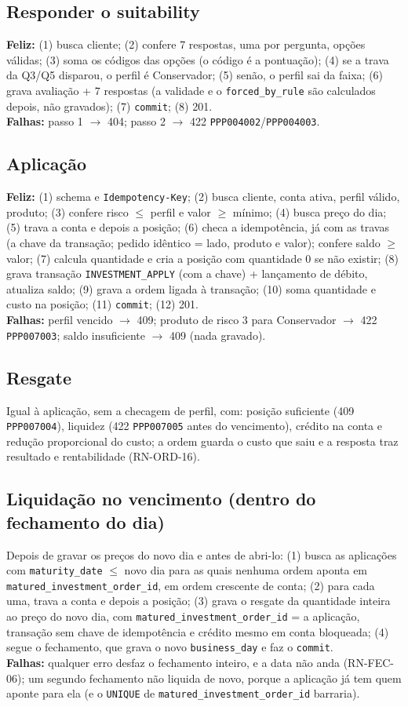 \documentclass[11pt,a4paper]{article}
\newcommand{\tb}[1]{\texttt{#1}}           %
\begin{document}
\subsection{Responder o suitability}
\textbf{Feliz:} (1) busca cliente; (2) confere 7 respostas, uma por pergunta, opções válidas; (3)
soma os códigos das opções (o código é a pontuação); (4) se a trava da Q3/Q5 disparou, o perfil
é Conservador; (5) senão, o perfil sai da faixa; (6) grava avaliação + 7 respostas (a validade e o
\tb{forced_by_rule} são calculados depois, não gravados); (7) \tb{commit}; (8) 201.\\
\textbf{Falhas:} passo 1 $\to$ 404; passo 2 $\to$ 422 \tb{PPP004002}/\tb{PPP004003}.

\subsection{Aplicação}
\textbf{Feliz:} (1) schema e \tb{Idempotency-Key}; (2) busca cliente, conta ativa, perfil
válido, produto; (3) confere risco $\le$ perfil e valor $\ge$ mínimo; (4) busca preço
do dia; (5) trava a conta e depois a posição; (6) checa a idempotência, já com as travas (a
chave da transação; pedido idêntico = lado, produto e valor); confere saldo $\ge$ valor; (7)
calcula quantidade e cria a posição com quantidade 0 se não existir; (8) grava transação
\tb{INVESTMENT_APPLY} (com a chave) + lançamento de débito, atualiza saldo; (9) grava a ordem
ligada à transação; (10) soma quantidade e custo na posição;
(11) \tb{commit}; (12) 201.\\
\textbf{Falhas:} perfil vencido $\to$ 409; produto de risco 3 para Conservador $\to$ 422
\tb{PPP007003}; saldo insuficiente $\to$ 409 (nada gravado).

\subsection{Resgate}
Igual à aplicação, sem a checagem de perfil, com: posição suficiente (409 \tb{PPP007004}),
liquidez (422 \tb{PPP007005} antes do vencimento), crédito na conta e redução proporcional do
custo; a ordem guarda o custo que saiu e a resposta traz resultado e rentabilidade (RN-ORD-16).

\subsection{Liquidação no vencimento (dentro do fechamento do dia)}
Depois de gravar os preços do novo dia e antes de abri-lo: (1) busca as aplicações com
\tb{maturity_date} $\le$ novo dia para as quais nenhuma ordem aponta em \tb{matured_investment_order_id},
em ordem crescente de conta; (2) para cada uma, trava a conta e depois a posição; (3) grava o
resgate da quantidade inteira ao preço do novo dia, com \tb{matured_investment_order_id} = a aplicação,
transação sem chave de idempotência e crédito mesmo em conta bloqueada; (4) segue o fechamento, que grava o
novo \tb{business_day} e faz o \tb{commit}.\\
\textbf{Falhas:} qualquer erro desfaz o fechamento inteiro, e a data não anda (RN-FEC-06); um
segundo fechamento não liquida de novo, porque a aplicação já tem quem aponte para ela (e o
\tb{UNIQUE} de \tb{matured_investment_order_id} barraria).
\end{document}

